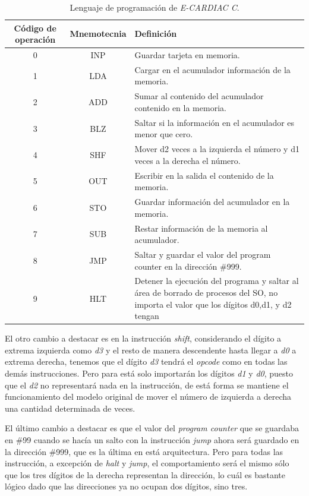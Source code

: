 \documentclass[letterpaper,12pt,oneside]{book}
\begin{document}
			\begin{table}[h]
			  \centering
			  \begin{tabular}{|c|c|p{8cm}|}
			    \hline
		    	\textbf{Código de operación} & \textbf{Mnemotecnia} & \textbf{Definición} \\
			    \hline
			    0 & INP & Guardar tarjeta en memoria.\\
			    \hline
				1 & LDA & Cargar en el acumulador información de la memoria.\\
				\hline
			    2 & ADD & Sumar al contenido del acumulador contenido en la memoria.\\
			    \hline
			    3 & BLZ & Saltar si la información en el acumulador es menor que cero.\\
			    \hline
			    4 & SHF & Mover d2 veces a la izquierda el número y d1 veces a la derecha el número.\\
			    \hline
			    5 & OUT & Escribir en la salida el contenido de la memoria.\\
			    \hline
			    6 & STO & Guardar información del acumulador en la memoria.\\
			    \hline
			    7 & SUB & Restar información de la memoria al acumulador.\\
			    \hline
			    8 & JMP & Saltar y guardar el valor del program counter en la dirección \#999. \\
			    \hline
			    9 & HLT & Detener la ejecución del programa y saltar al área de borrado de procesos del SO, no importa el valor que los dígitos d0,d1, y d2 tengan\\
			    \hline
			  \end{tabular}
			  \caption{Lenguaje de programación de \textit{E-CARDIAC C}.}
			  \label{tab:programing_language_ecc}
			\end{table}

		El otro cambio a destacar es en la instrucción \textit{shift}, considerando el dígito a extrema izquierda como \textit{d3} y el resto de manera descendente
		hasta llegar a \textit{d0} a extrema derecha, tenemos que el dígito \textit{d3} tendrá el \textit{opcode} como en todas las demás instrucciones. Pero
		para está solo importarán los dígitos \textit{d1} y \textit{d0}, puesto que el \textit{d2} no representará nada en la instrucción, de está forma
		se mantiene el funcionamiento del modelo original de mover el número de izquierda a derecha una cantidad determinada de veces.
		
		El último cambio a destacar es que el valor del \textit{program counter} que se guardaba en \#99 cuando se hacía un salto con la instrucción \textit{jump} ahora
		será guardado en la dirección \#999, que es la última en está arquitectura. Pero para todas las instrucción, a excepción de \textit{halt} y \textit{jump},
		el comportamiento será el mismo sólo que los tres dígitos de la derecha representan la dirección, lo cuál es bastante lógico dado que las direcciones
		ya no ocupan dos dígitos, sino tres.
		
\end{document}
